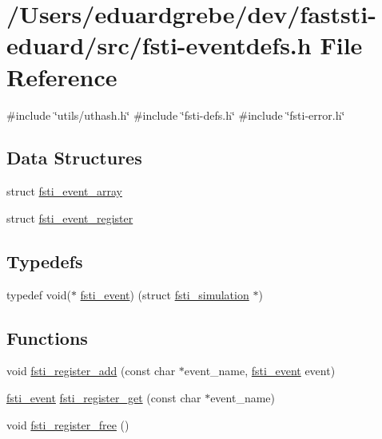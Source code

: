 \hypertarget{fsti-eventdefs_8h}{}\section{/\+Users/eduardgrebe/dev/faststi-\/eduard/src/fsti-\/eventdefs.h File Reference}
\label{fsti-eventdefs_8h}
{\ttfamily \#include \char`\"{}utils/uthash.\+h\char`\"{}}\newline
{\ttfamily \#include \char`\"{}fsti-\/defs.\+h\char`\"{}}\newline
{\ttfamily \#include \char`\"{}fsti-\/error.\+h\char`\"{}}\newline
\subsection*{Data Structures}
\begin{DoxyCompactItemize}
\item 
struct \mbox{\hyperlink{structfsti__event__array}{fsti\+\_\+event\+\_\+array}}
\item 
struct \mbox{\hyperlink{structfsti__event__register}{fsti\+\_\+event\+\_\+register}}
\end{DoxyCompactItemize}
\subsection*{Typedefs}
\begin{DoxyCompactItemize}
\item 
typedef void($\ast$ \mbox{\hyperlink{fsti-eventdefs_8h_abce6b23e84620b4f4433c952fa10f0b9}{fsti\+\_\+event}}) (struct \mbox{\hyperlink{structfsti__simulation}{fsti\+\_\+simulation}} $\ast$)
\end{DoxyCompactItemize}
\subsection*{Functions}
\begin{DoxyCompactItemize}
\item 
void \mbox{\hyperlink{fsti-eventdefs_8h_aa0b6464d8da748522498a11bc033fee1}{fsti\+\_\+register\+\_\+add}} (const char $\ast$event\+\_\+name, \mbox{\hyperlink{fsti-eventdefs_8h_abce6b23e84620b4f4433c952fa10f0b9}{fsti\+\_\+event}} event)
\item 
\mbox{\hyperlink{fsti-eventdefs_8h_abce6b23e84620b4f4433c952fa10f0b9}{fsti\+\_\+event}} \mbox{\hyperlink{fsti-eventdefs_8h_ab8a67816c82580412dd9c89b610d43ef}{fsti\+\_\+register\+\_\+get}} (const char $\ast$event\+\_\+name)
\item 
void \mbox{\hyperlink{fsti-eventdefs_8h_a57f74d766c59e7d2ad998981c4c00a1e}{fsti\+\_\+register\+\_\+free}} ()
\end{DoxyCompactItemize}


